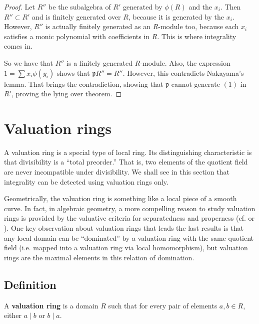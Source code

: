 \begin{proof}
Let $R''$ be the subalgebra of $R'$ generated by $\phi(R)$ and the $x_i$. Then
$R'' \subset R'$ and is finitely generated over $R$, because it is generated by
the $x_i$. However, $R''$ is actually finitely generated as an $R$-module too,
because each $x_i$ satisfies a monic polynomial with coefficients in $R$. This
is where integrality comes in.

So we have that $R''$ is a finitely generated $R$-module. Also, the expression
$1 = \sum x_i \phi(y_i)$ shows that $\mathfrak{p}R'' = R''$. However, this
contradicts Nakayama's lemma. That brings the contradiction, showing that
$\mathfrak{p}$ cannot generate $(1)$ in $R'$, proving the lying over theorem. 

\end{proof} 





\section{Valuation rings}

A valuation ring is a special type of local ring. Its distinguishing
characteristic is that divisibility is a ``total preorder.'' That is, two
elements of the quotient field are never incompatible under divisibility.
 We shall see in this section that integrality can be detected using
valuation rings only.

Geometrically, the valuation ring is something like a local piece of a smooth
curve. In fact, in algebraic geometry, a more compelling reason to study
valuation rings is provided by the valuative criteria for separatedness and
properness (cf. \cite{EGA} or \cite{Ha77}).  One key observation about
valuation rings that leads the last results is that any local domain can be
``dominated'' by a valuation ring with the same quotient field (i.e. mapped into a valuation ring via local
homomorphism), but valuation rings are the maximal elements in this relation
of domination.

\subsection{Definition}

\begin{definition} 
A \textbf{valuation ring} is a domain $R$ such that for every pair of elements
$a,b \in R$, either $a \mid b$ or $b \mid a$. 
\end{definition} 

